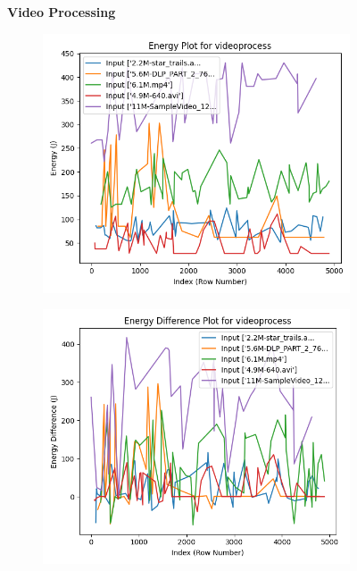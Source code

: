 \documentclass[times, 10pt,twocolumn]{article}
\begin{document}
\begin{figure}[ht]
   \textbf{Video Processing}\par\medskip
   \begin{subfigure}[b]{0.22\textwidth}
      \includegraphics[width=\textwidth]{imgs/final_experiment_plots/model_analysis/measurement_data_analysis/video_energy.png}
     \caption{}
     \label{fig:video_energy}
   \end{subfigure}
   \hfill
   \begin{subfigure}[b]{0.22\textwidth}
      \includegraphics[width=\textwidth]{imgs/final_experiment_plots/model_analysis/measurement_data_analysis/video_energy_diff.png}

\end{subfigure}
\end{figure}
\end{document}
